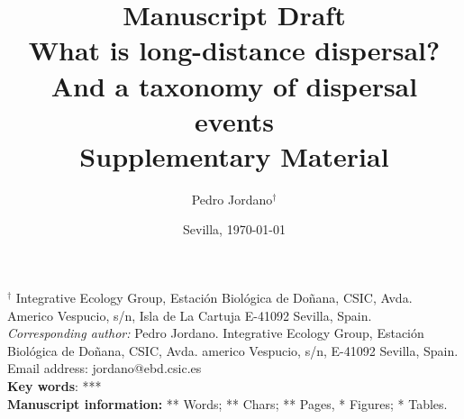 \documentclass[a4paper, 12pt]{article}}
\begin{document}
\title{Manuscript Draft\\
\vspace{2cm}
What is long-distance dispersal? And a taxonomy of dispersal events \\
\textbf{Supplementary Material}}

\author{Pedro Jordano$^{\dag}$}

\date{Sevilla, \today}
\maketitle


\begin{spacing}{1.0}
$^{\dag}$ {\small Integrative Ecology Group, Estaci\'on Biol\'ogica de 
Do\~nana, CSIC, Avda. Americo Vespucio, s/n, Isla de La Cartuja
E-41092 Sevilla, Spain.}\\


{\small \textit{Corresponding author:} Pedro Jordano. Integrative Ecology Group, Estaci\'on Biol\'ogica de Do\~nana, CSIC, Avda. americo Vespucio, s/n, E-41092 Sevilla, Spain. Email address: jordano@ebd.csic.es}\\

\textbf{Key words}: ***\\

{\small \textbf{Manuscript information: }** Words; ** Chars; ** Pages, * Figures; * Tables.}
\end{spacing}

\maketitle
\newpage
\end{document}

